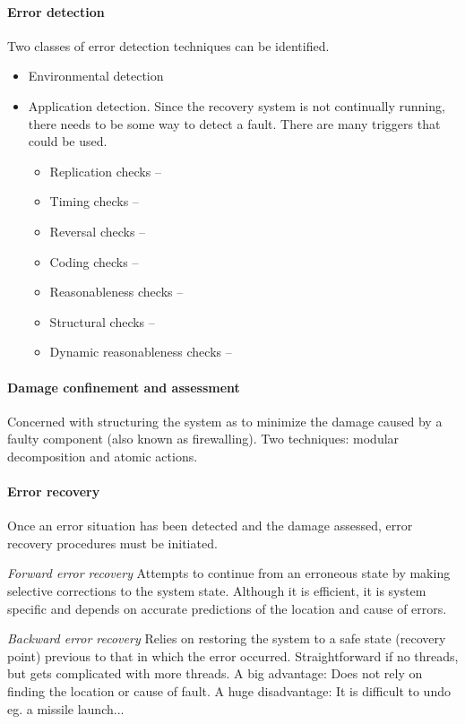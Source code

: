 \paragraph{Error detection} Two classes of error detection techniques can be identified.
\begin{itemize}[nolistsep,noitemsep]
  \item Environmental detection
  \item Application detection. Since the recovery system is not continually running, there needs to be some way to detect a fault. There are many triggers that could be used.
  \begin{itemize}[nolistsep,noitemsep]
    \item Replication checks --
    \item Timing checks --
    \item Reversal checks --
    \item Coding checks --
    \item Reasonableness checks --
    \item Structural checks --
    \item Dynamic reasonableness checks --
  \end{itemize}
\end{itemize}

\paragraph{Damage confinement and assessment} Concerned with structuring the system as to minimize the damage caused by a faulty component (also known as firewalling). Two techniques: modular decomposition and atomic actions.

\paragraph{Error recovery} Once an error situation has been detected and the damage assessed, error recovery procedures must be initiated.

\textit{Forward error recovery} Attempts to continue from an erroneous state by making selective corrections to the system state. Although it is efficient, it is system specific and depends on accurate predictions of the location and cause of errors.

\textit{Backward error recovery} Relies on restoring the system to a safe state (recovery point) previous to that in which the error occurred. Straightforward if no threads, but gets complicated with more threads. A big advantage: Does not rely on finding the location or cause of fault. A huge disadvantage: It is difficult to undo eg. a missile launch...

